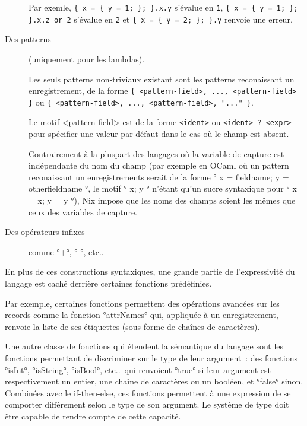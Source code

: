 \begin{description}
    Par exemle, \lstinline|{ x = { y = 1; }; }.x.y| s'évalue en \lstinline{1},
    \lstinline|{ x = { y = 1; }; }.x.z or 2| s'évalue en \lstinline{2} et
    \lstinline|{ x = { y = 2; }; }.y| renvoie une erreur.

  \item[Des patterns] (uniquement pour les lambdas).

    Les seuls patterns non-triviaux existant sont les patterns reconaissant un
    enregistrement, de la forme
    \lstinline|{ <pattern-field>, ..., <pattern-field> }| %
    ou
    \lstinline|{ <pattern-field>, ..., <pattern-field>, "..." }|. %

    Le motif <pattern-field> est de la forme \lstinline{<ident>} ou
    \lstinline{<ident> ? <expr>} pour spécifier une valeur par défaut dans le
    cas où le champ est absent.

    Contrairement à la pluspart des langages où la variable de capture est
    indépendante du nom du champ (par exemple en OCaml où un pattern
    reconaissant un enregistrements serait de la forme
    °{ x = fieldname; y = otherfieldname }°, le motif °{ x; y }° n'étant qu'un
    sucre syntaxique pour °{ x = x; y = y }°), Nix impose que les noms des
    champs soient les mêmes que ceux des variables de capture.

  \item[Des opérateurs infixes] comme °+°, °-°, etc..

\end{description}

En plus de ces constructions syntaxiques, une grande partie de l'expressivité
du langage est caché derrière certaines fonctions prédéfinies.

Par exemple, certaines fonctions permettent des opérations avancées sur les
records comme la fonction °attrNames° qui, appliquée à un
enregistrement, renvoie la liste de ses étiquettes (sous forme de chaînes de
caractères).

Une autre classe de fonctions qui étendent la sémantique du langage sont les
fonctions permettant de discriminer sur le type de leur argument : des
fonctions °isInt°, °isString°, °isBool°, etc..\ qui renvoient °true° si leur
argument est respectivement un entier, une chaîne de caractères ou un booléen,
et °false° sinon.
Combinées avec le if-then-else, ces fonctions permettent à une expression de se
comporter différement selon le type de son argument. Le système de type doit
être capable de rendre compte de cette capacité.

